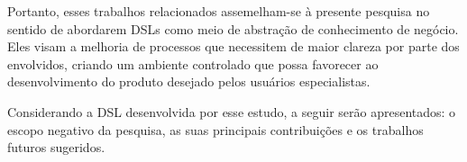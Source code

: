 Portanto, esses trabalhos relacionados assemelham-se à presente pesquisa no sentido de abordarem DSLs como meio de abstração de conhecimento de negócio. Eles visam a melhoria de processos que necessitem de maior clareza por parte dos envolvidos, criando um ambiente controlado que possa favorecer ao desenvolvimento do produto desejado pelos usuários especialistas. 

Considerando a DSL desenvolvida por esse estudo, a seguir serão apresentados: o escopo negativo da pesquisa, as suas principais contribuições e os trabalhos futuros sugeridos.
